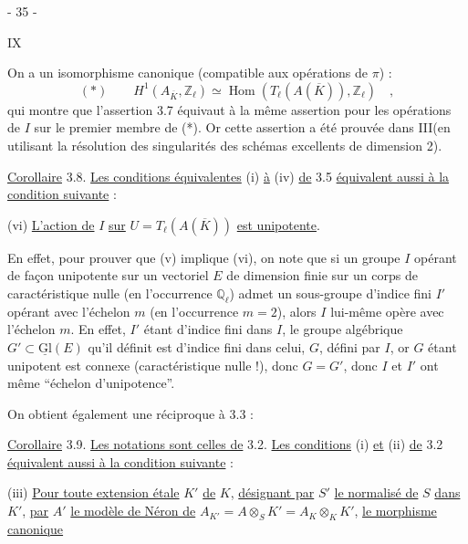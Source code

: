\begin{center}- 35 -\end{center}\hfill IX

On a un isomorphisme canonique (compatible aux opérations de $\pi$) :
\[
(*)\qquad H^1(A_{\overline K},\mathbb Z_\ell)\simeq\operatorname{Hom}(T_\ell(A(\overline K)),\mathbb Z_\ell)\quad,
\]
qui montre que l'assertion 3.7 équivaut à la même assertion pour les opérations de $I$ sur le premier membre de (*). Or cette assertion a été prouvée dans III\quad (en utilisant la résolution des singularités des schémas excellents de dimension 2).

\uline{Corollaire} 3.8. \uline{Les conditions équivalentes} (i) \uline{à} (iv) \uline{de} 3.5 \uline{équivalent aussi à la condition suivante} :

(vi) \uline{L'action de} $I$ \uline{sur} $U=T_\ell(A(\overline K))$ \uline{est unipotente}.

En effet, pour prouver que (v) implique (vi), on note que si un groupe $I$ opérant de façon unipotente sur un vectoriel $E$ de dimension finie sur un corps de caractéristique nulle (en l'occurrence $\mathbb Q_\ell$) admet un sous-groupe d'indice fini $I'$ opérant avec l'échelon $m$ (en l'occurrence $m=2$), alors $I$ lui-même opère avec l'échelon $m$. En effet, $I'$ étant d'indice fini dans $I$, le groupe algébrique $G'\subset\underline{\mathrm{Gl}}(E)$ qu'il définit est d'indice fini dans celui, $G$, défini par $I$, or $G$ étant unipotent est connexe (caractéristique nulle !), donc $G=G'$, donc $I$ et $I'$ ont même ``échelon d'unipotence''.

On obtient également une réciproque à 3.3 :

\uline{Corollaire} 3.9. \uline{Les notations sont celles de} 3.2. \uline{Les conditions} (i) \uline{et} (ii) \uline{de} 3.2 \uline{équivalent aussi à la condition suivante} :

(iii) \uline{Pour toute extension étale} $K'$ \uline{de} $K$, \uline{désignant par} $S'$ \uline{le normalisé de} $S$ \uline{dans} $K'$, \uline{par} $A'$ \uline{le modèle de Néron de} $A_{K'}=A\otimes_S K'=A_K\otimes_K K'$, \uline{le morphisme canonique}



